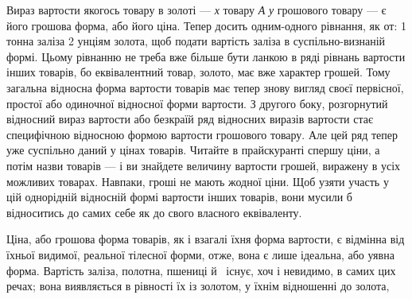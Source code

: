 Вираз вартости якогось товару в золоті — \emph{х} товару \emph{А} \deq{} \emph{у}
грошового товару — є його грошова форма, або його ціна. Тепер
досить одним-одного рівнання, як от: 1 тонна заліза \deq{} 2 унціям
золота, щоб подати вартість заліза в суспільно-визнаній формі.
Цьому рівнанню не треба вже більше бути ланкою в ряді рівнань
вартости інших товарів, бо еквівалентний товар, золото, має
вже характер грошей. Тому загальна відносна форма вартости
товарів має тепер знову вигляд своєї первісної, простої або одиночної
відносної форми вартости. З другого боку, розгорнутий
відносний вираз вартости або безкраїй ряд відносних виразів
вартости стає специфічною відносною формою вартости грошового
товару. Але цей ряд тепер уже суспільно даний у цінах
товарів. Читайте в прайскуранті спершу ціни, а потім назви
товарів — і ви знайдете величину вартости грошей, виражену
в усіх можливих товарах. Навпаки, гроші не мають жодної
ціни. Щоб узяти участь у цій однорідній відносній формі вартости
інших товарів, вони мусили б відноситись до самих себе як до
свого власного еквіваленту.

Ціна, або грошова форма товарів, як і взагалі їхня форма вартости,
є відмінна від їхньої видимої, реальної тілесної форми, отже,
вона є лише ідеальна, або уявна форма. Вартість заліза, полотна,
пшениці й~ існує, хоч і невидимо, в самих цих речах; вона
виявляється в рівності їх із золотом, у їхнім відношенні до золота,
\parbreak{}  %
